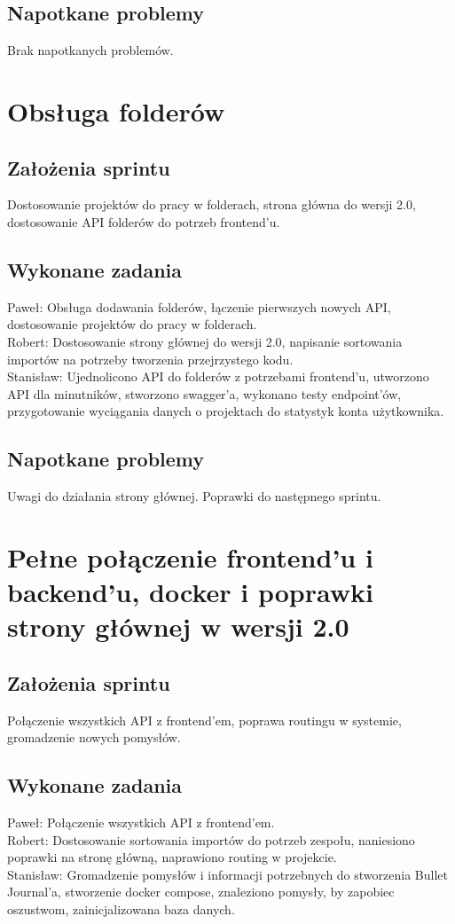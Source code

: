 \documentclass[a4paper,11pt]{report}
\begin{document}
\subsection {Napotkane problemy}
Brak napotkanych problemów.

\section {Obsługa folderów}
\subsection {Założenia sprintu}
Dostosowanie projektów do pracy w folderach, strona główna do wersji 2.0, dostosowanie API folderów do potrzeb frontend'u.
\subsection {Wykonane zadania}
Paweł: Obsługa dodawania folderów, łączenie pierwszych nowych API, dostosowanie projektów do pracy w folderach.\\ 
Robert: Dostosowanie strony głównej do wersji 2.0, napisanie sortowania importów na potrzeby tworzenia przejrzystego kodu.\\
Stanisław: Ujednolicono API do folderów z potrzebami frontend'u, utworzono API dla minutników, stworzono swagger'a, wykonano testy endpoint'ów, przygotowanie wyciągania danych o projektach do statystyk konta użytkownika.\\  
\subsection {Napotkane problemy}
Uwagi do działania strony głównej. Poprawki do następnego sprintu.

\section {Pełne połączenie frontend'u i backend'u, docker i poprawki strony głównej w wersji 2.0}
\subsection {Założenia sprintu}
Połączenie wszystkich API z frontend'em, poprawa routingu w systemie, gromadzenie nowych pomysłów.
\subsection {Wykonane zadania}
Paweł: Połączenie wszystkich API z frontend'em.\\
Robert:  Dostosowanie sortowania importów do potrzeb zespołu, naniesiono poprawki na stronę główną, naprawiono routing w projekcie.\\ 
Stanisław: Gromadzenie pomysłów i informacji potrzebnych do stworzenia Bullet Journal'a, stworzenie docker compose, znaleziono pomysły, by zapobiec oszustwom, zainicjalizowana baza danych.\\ 
\end{document}
